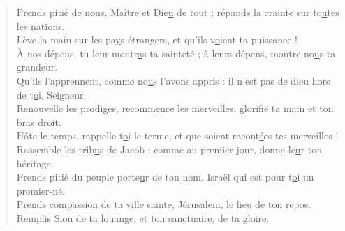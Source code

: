 \begin{verse}
Prends pitié de nous, Maître et Die\underline{u} de tout ;\psalmstar
répands la crainte sur to\underline{u}tes les nations.\\
Lève la main sur les pa\underline{y}s étrangers,\psalmstar
et qu'ils v\underline{o}ient ta puissance !\\

À nos dépens, tu leur montr\underline{a}s ta sainteté ;\psalmstar
à leurs dépens, montre-no\underline{u}s ta grandeur.\\
Qu'ils l'apprennent, comme no\underline{u}s l'avons appris :\psalmstar
il n'est pas de dieu hors de t\underline{o}i, Seigneur.\\

Renouvelle les prodiges, recomm\underline{e}nce les merveilles,\psalmstar
glorifie ta m\underline{a}in et ton bras droit.\\
Hâte le temps, rappelle-t\underline{o}i le terme,\psalmstar
et que soient racont\underline{é}es tes merveilles !\\

Rassemble les trib\underline{u}s de Jacob ;\psalmstar
comme au premier jour, donne-le\underline{u}r ton héritage.\\
Prends pitié du peuple porte\underline{u}r de ton nom,\psalmstar
Israël qui est pour t\underline{o}i un premier-né.\\

Prends compassion de ta v\underline{i}lle sainte,\psalmstar
Jérusalem, le lie\underline{u} de ton repos.\\
Remplis Si\underline{o}n de ta louange,\psalmstar
et ton sanctu\underline{a}ire, de ta gloire.
\end{verse}

